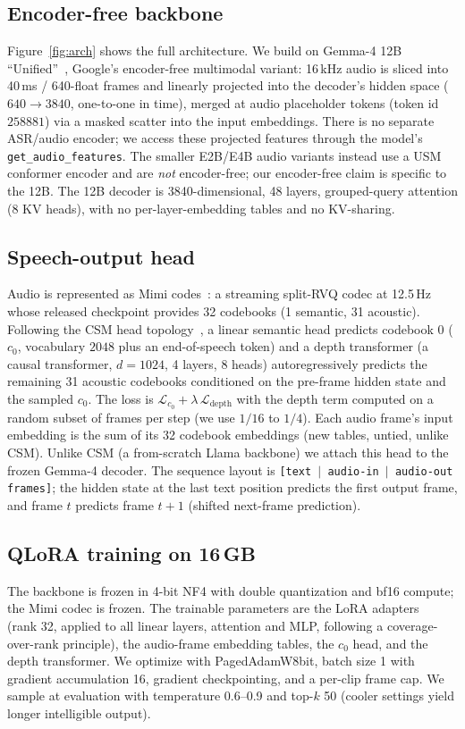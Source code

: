 \documentclass[11pt]{article}
\begin{document}
\subsection{Encoder-free backbone}
Figure~\ref{fig:arch} shows the full architecture.
We build on Gemma-4 12B ``Unified''~\citep{gemma4_2026}, Google's encoder-free
multimodal variant: 16\,kHz audio is sliced into 40\,ms / 640-float frames and
linearly projected into the decoder's hidden space ($640\to3840$, one-to-one in
time), merged at audio placeholder tokens (token id $258881$) via a masked
scatter into the input embeddings. There is no separate ASR/audio encoder; we
access these projected features through the model's \texttt{get\_audio\_features}.
The smaller E2B/E4B audio variants instead use a USM conformer encoder and are
\emph{not} encoder-free; our encoder-free claim is specific to the 12B. The 12B
decoder is 3840-dimensional, 48 layers, grouped-query attention (8 KV heads), with
no per-layer-embedding tables and no KV-sharing.

\subsection{Speech-output head}
Audio is represented as Mimi codes~\citep{defossez2024moshi}: a streaming
split-RVQ codec at 12.5\,Hz whose released checkpoint provides 32 codebooks
(1 semantic, 31 acoustic). Following the CSM head topology~\citep{sesame2025csm},
a linear semantic head predicts codebook 0 ($c_0$, vocabulary $2048$ plus an
end-of-speech token) and a depth transformer (a causal transformer, $d{=}1024$,
4 layers, 8 heads) autoregressively predicts the remaining 31 acoustic codebooks
conditioned on the pre-frame hidden state and the sampled $c_0$. The loss is
$\mathcal{L}_{c_0} + \lambda\,\mathcal{L}_{\text{depth}}$ with the depth term
computed on a random subset of frames per step (we use $1/16$ to $1/4$). Each
audio frame's input embedding is the sum of its 32 codebook embeddings (new
tables, untied, unlike CSM). Unlike CSM (a from-scratch Llama backbone) we attach
this head to the frozen Gemma-4 decoder. The sequence layout is
\texttt{[text $\mid$ audio-in $\mid$ audio-out frames]}; the hidden state at the
last text position predicts the first output frame, and frame $t$ predicts frame
$t{+}1$ (shifted next-frame prediction).

\subsection{QLoRA training on 16\,GB}
The backbone is frozen in 4-bit NF4 with double quantization and bf16 compute;
the Mimi codec is frozen. The trainable parameters are the LoRA
adapters~\citep{dettmers2023qlora} (rank 32, applied to all linear layers,
attention and MLP, following a coverage-over-rank principle), the audio-frame
embedding tables, the $c_0$ head, and the depth transformer. We optimize with
PagedAdamW8bit, batch size 1 with gradient accumulation 16, gradient
checkpointing, and a per-clip frame cap. We sample at evaluation with temperature
0.6--0.9 and top-$k$ 50 (cooler settings yield longer intelligible output).
\end{document}
